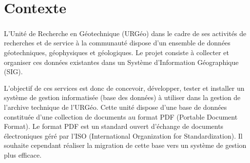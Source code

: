 \chapter{Contexte}
\paragraph{}
L’Unité de Recherche en Géotechnique (URGéo) dans le cadre de ses activités 
de recherches et de service à la communauté dispose d’un ensemble de données 
géotechniques, géophysiques et géologiques. Le projet consiste à collecter et 
organiser ces données existantes dans un Système d’Information Géographique (SIG).\par 
L’objectif de ces services est donc de concevoir, développer, tester et installer un 
système de gestion informatisée (base des données) à utiliser dans la gestion de l’archive 
technique de l’URGéo. Cette unité dispose d'une base de données constituée d’une 
collection de documents au format PDF (Portable Document Format). Le format PDF est un 
standard ouvert d'échange de documents électroniques géré par l’ISO (International 
Organization for Standardization). Il souhaite cependant réaliser la migration de 
cette base vers un système de gestion plus efficace.